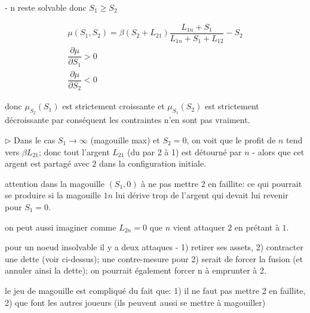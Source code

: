 \documentclass{article}
\def\AR#1{
\[
\begin{array}{llllllll}
#1
\end{array}
\]
}
\begin{document}
- n reste solvable donc $S_{1} \geq S_{2}$

\AR{
\mu(S_{1},S_{2}) = 
\beta
(S_{2} + L_{21}) 
\dfrac
{L_{1n}+S_{1}}
{L_{1n}+S_{1}+L_{12}}
- S_{2}
\\
\dfrac
{\partial \mu}
{\partial S_{1}} 
>
0\\
\dfrac
{\partial \mu}
{\partial S_{2}} 
<
0
} 

donc $\mu_{S_{2}}(S_{1})$ est strictement croissante et $\mu_{S_{1}}(S_{2})$ est strictement décroissante par conséquent les contraintes n'en sont pas vraiment.


$\triangleright$ 
Dans le cas $S_1\to\infty$ (magouille max) et $S_2=0$, on voit que
le profit de $n$ tend vers $\beta L_{21}$; donc tout l'argent $L_{21}$ (du par 2 à 1) est détourné par $n$ - alors que cet argent est partagé avec $2$ dans la configuration initiale.

attention dans la magouille $(S_1,0)$ à ne pas mettre 2 en faillite:
ce qui pourrait se produire si la magouille $1n$ 
lui dérive trop de l'argent qui devait lui revenir pour $S_1=0$.

on peut aussi imaginer comme $L_{2n}=0$
que $n$ vient attaquer $2$ en prétant à $1$.

pour un noeud insolvable il y a deux attaques - 1) retirer ses assets, 2) contracter une dette (voir ci-dessus); une contre-mesure pour 2) serait de forcer la fusion (et annuler ainsi la dette); on pourrait également forcer n à emprunter à 2.

le jeu de magouille est compliqué du fait que: 1) il ne faut pas mettre 2 en faillite, 2) que font les autres joueurs (ils peuvent aussi se mettre à magouiller)
\end{document}
